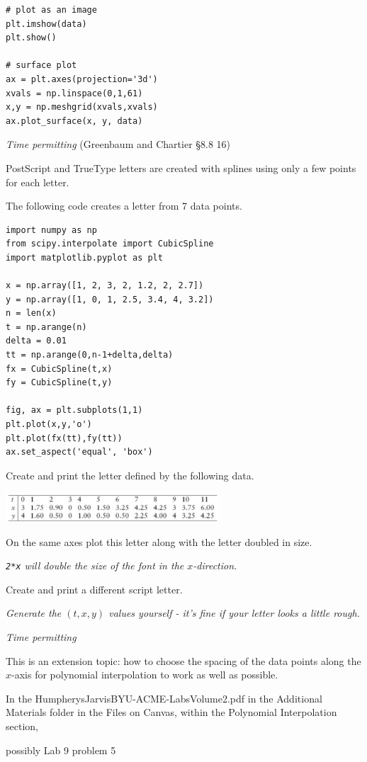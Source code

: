 \documentclass[12pt,letterpaper,noanswers]{exam}
\begin{document}
\begin{questions}
\begin{parts}
\begin{verbatim}
# plot as an image
plt.imshow(data)
plt.show()

# surface plot
ax = plt.axes(projection='3d')
xvals = np.linspace(0,1,61)
x,y = np.meshgrid(xvals,xvals)
ax.plot_surface(x, y, data)
\end{verbatim}
\end{parts}


\item \emph{Time permitting} (Greenbaum and Chartier \S8.8 16)

PostScript and TrueType letters are created with splines using only a few points for each letter.  


The following code creates a letter from 7 data points.
\begin{verbatim}
import numpy as np
from scipy.interpolate import CubicSpline
import matplotlib.pyplot as plt

x = np.array([1, 2, 3, 2, 1.2, 2, 2.7])
y = np.array([1, 0, 1, 2.5, 3.4, 4, 3.2])
n = len(x)
t = np.arange(n)
delta = 0.01
tt = np.arange(0,n-1+delta,delta)
fx = CubicSpline(t,x)
fy = CubicSpline(t,y)

fig, ax = plt.subplots(1,1)
plt.plot(x,y,'o')
plt.plot(fx(tt),fy(tt))
ax.set_aspect('equal', 'box')    
\end{verbatim}

\begin{parts}
\item Create and print the letter defined by the following data.

\includegraphics[width=0.6\textwidth]{img/PSet05letterdata.png}

\item On the same axes plot this letter along with the letter doubled in size.

\emph{\texttt{2*x} will double the size of the font in the $x$-direction.}

\item Create and print a different script letter.

\emph{Generate the $(t,x,y)$ values yourself - it's fine if your letter looks a little rough.}
\end{parts}






\item \emph{Time permitting} 

This is an extension topic: how to choose the spacing of the data points along the $x$-axis for polynomial interpolation to work as well as possible.


In the HumpherysJarvisBYU-ACME-LabsVolume2.pdf in the Additional Materials folder in the Files on Canvas, within the Polynomial Interpolation section, 

possibly Lab 9 problem 5

\end{questions}
\end{document}
